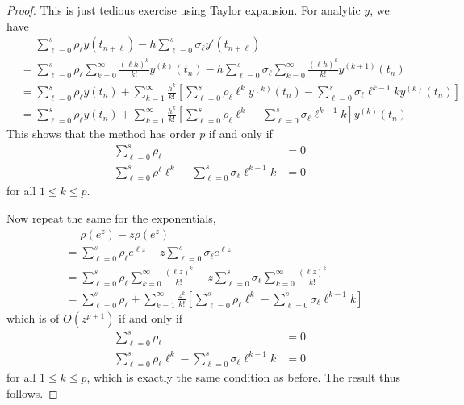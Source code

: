 \documentclass[a4paper]{article}
\begin{document}
\begin{proof}
  This is just tedious exercise using Taylor expansion. For analytic \(y\), we have
  \begin{align*}
    &\phantom{={} } \sum_{\ell = 0}^s \rho_\ell y(t_{n + \ell}) - h \sum_{\ell = 0}^s \sigma_\ell y'(t_{n + \ell}) \\
    &= \sum_{\ell = 0}^s \rho_\ell \sum_{k = 0}^\infty \frac{(\ell h)^k}{k!} y^{(k)}(t_n) - h \sum_{\ell = 0}^s \sigma_\ell \sum_{k = 0}^\infty \frac{(\ell h)^k}{k!} y^{(k + 1)}(t_n) \\
    &= \sum_{\ell = 0}^s \rho_\ell y(t_n) + \sum_{k = 1}^\infty \frac{h^k}{k!} \left[\sum_{\ell = 0}^s \rho_\ell \ell^k y^{(k)}(t_n) - \sum_{\ell = 0}^s \sigma_\ell \ell^{k - 1} ky^{(k)}(t_n) \right] \\
    &= \sum_{\ell = 0}^s \rho_\ell y(t_n) + \sum_{k = 1}^\infty \frac{h^k}{k!} \left[ \sum_{\ell = 0}^s \rho_\ell \ell^k - \sum_{\ell = 0}^s \sigma_\ell \ell^{k - 1} k \right] y^{(k)}(t_n)
  \end{align*}
  This shows that the method has order \(p\) if and only if
  \begin{align*}
    \sum_{\ell = 0}^s \rho_\ell &= 0 \\
    \sum_{\ell = 0}^s \rho^\ell \ell^k - \sum_{\ell = 0}^s \sigma_\ell \ell^{k - 1}k &= 0
  \end{align*}
  for all \(1 \leq k \leq p\).

  Now repeat the same for the exponentials,
  \begin{align*}
    &\phantom{={} } \rho(e^z) - z\rho(e^z) \\
    &= \sum_{\ell = 0}^s \rho_\ell e^{\ell z} - z \sum_{\ell = 0}^s \sigma_\ell e^{\ell z} \\
    &= \sum_{\ell = 0}^s \rho_\ell \sum_{k = 0}^\infty \frac{(\ell z)^k}{k!} - z\sum_{\ell = 0}^s \sigma_\ell \sum_{k = 0}^\infty \frac{(\ell z)^k}{k!} \\
    &= \sum_{\ell = 0}^s \rho_\ell + \sum_{k = 1}^\infty \frac{z^k}{k!} \left[ \sum_{\ell = 0}^s \rho_\ell \ell^k - \sum_{\ell = 0}^s \sigma_\ell \ell^{k - 1}k \right]
  \end{align*}
  which is of \(O(z^{p + 1})\) if and only if
  \begin{align*}
    \sum_{\ell = 0}^s \rho_\ell &= 0 \\
    \sum_{\ell = 0}^s \rho_\ell \ell^k - \sum_{\ell = 0}^s \sigma_\ell \ell^{k - 1}k &= 0
  \end{align*}
  for all \(1 \leq k \leq p\), which is exactly the same condition as before. The result thus follows.
\end{proof}
\end{document}
